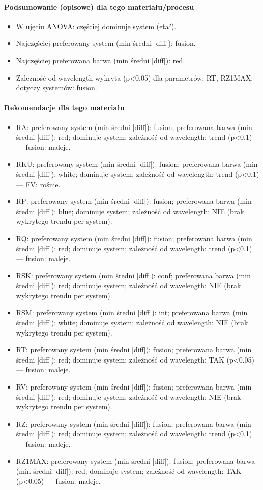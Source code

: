 \documentclass[
  10pt,
]{article}
\begin{document}
\paragraph{Podsumowanie (opisowe) dla tego materiału/procesu}
\begin{itemize}
\item W ujęciu ANOVA: częściej dominuje system (eta²).
\item Najczęściej preferowany system (min średni |diff|): fusion.
\item Najczęściej preferowana barwa (min średni |diff|): red.
\item Zależność od wavelength wykryta (p<0.05) dla parametrów: RT, RZ1MAX; dotyczy systemów: fusion.
\end{itemize}
\paragraph{Rekomendacje dla tego materiału}
\begin{itemize}
\item RA: preferowany system (min średni |diff|): fusion; preferowana barwa (min średni |diff|): red; dominuje system; zależność od wavelength: trend (p<0.1) — fusion: maleje.
\item RKU: preferowany system (min średni |diff|): fusion; preferowana barwa (min średni |diff|): white; dominuje system; zależność od wavelength: trend (p<0.1) — FV: rośnie.
\item RP: preferowany system (min średni |diff|): fusion; preferowana barwa (min średni |diff|): blue; dominuje system; zależność od wavelength: NIE (brak wykrytego trendu per system).
\item RQ: preferowany system (min średni |diff|): fusion; preferowana barwa (min średni |diff|): red; dominuje system; zależność od wavelength: trend (p<0.1) — fusion: maleje.
\item RSK: preferowany system (min średni |diff|): conf; preferowana barwa (min średni |diff|): red; dominuje system; zależność od wavelength: NIE (brak wykrytego trendu per system).
\item RSM: preferowany system (min średni |diff|): int; preferowana barwa (min średni |diff|): white; dominuje system; zależność od wavelength: NIE (brak wykrytego trendu per system).
\item RT: preferowany system (min średni |diff|): fusion; preferowana barwa (min średni |diff|): red; dominuje system; zależność od wavelength: TAK (p<0.05) — fusion: maleje.
\item RV: preferowany system (min średni |diff|): fusion; preferowana barwa (min średni |diff|): red; dominuje system; zależność od wavelength: NIE (brak wykrytego trendu per system).
\item RZ: preferowany system (min średni |diff|): fusion; preferowana barwa (min średni |diff|): red; dominuje system; zależność od wavelength: trend (p<0.1) — fusion: maleje.
\item RZ1MAX: preferowany system (min średni |diff|): fusion; preferowana barwa (min średni |diff|): red; dominuje system; zależność od wavelength: TAK (p<0.05) — fusion: maleje.
\end{itemize}
\end{document}
